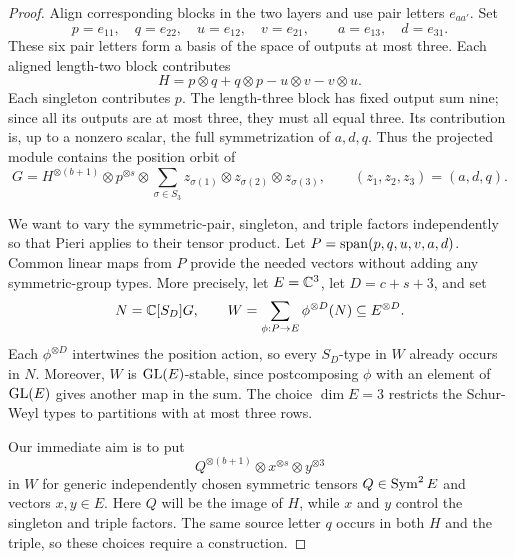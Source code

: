 \begin{proof}
Align corresponding blocks in the two layers and use pair letters
$e_{aa'}$.  Set
\[
 p=e_{11},\quad q=e_{22},\quad u=e_{12},\quad v=e_{21},
 \qquad a=e_{13},\quad d=e_{31}.
\]
These six pair letters form a basis of the space of outputs at
most three.  Each aligned length-two block contributes
\begin{equation}
 H=p\otimes q+q\otimes p-u\otimes v-v\otimes u.
 \label{bal:four-form}
\end{equation}
Each singleton contributes $p$.  The length-three block has
fixed output sum nine; since all its outputs are at most three,
they must all equal three.  Its contribution is, up to a nonzero
scalar, the full symmetrization of $a,d,q$.  Thus the projected
module contains the position orbit of
\begin{equation}
 G=H^{\otimes(b+1)}\otimes p^{\otimes s}
       \otimes\sum_{\sigma\in S_3}
                z_{\sigma(1)}\otimes z_{\sigma(2)}
                              \otimes z_{\sigma(3)},
 \qquad (z_1,z_2,z_3)=(a,d,q).
 \label{bal:three-generator}
\end{equation}

We want to vary the symmetric-pair, singleton, and triple factors
independently so that Pieri applies to their tensor product.
Let $P=\operatorname{span}(p,q,u,v,a,d)$. Common linear maps from $P$ provide
the needed vectors without adding any symmetric-group types.
More precisely, let $E=\mathbb C^3$, let $D=c+s+3$, and set
\[
 N=\mathbb C[S_D]G,\qquad
 W=\sum_{\phi:P\to E}\phi^{\otimes D}(N)
       \subseteq E^{\otimes D}.
\]
Each $\phi^{\otimes D}$ intertwines the position action, so every
$S_D$-type in $W$ already occurs in $N$. Moreover, $W$ is
$\operatorname{GL}(E)$-stable, since postcomposing $\phi$ with an element of
$\operatorname{GL}(E)$ gives another map in the sum. The choice $\dim E=3$
restricts the Schur-Weyl types to partitions with at most three rows.

Our immediate aim is to put
\begin{equation}
 Q^{\otimes(b+1)}\otimes x^{\otimes s}\otimes y^{\otimes3}
 \label{bal:independent-tensors}
\end{equation}
in $W$ for generic independently chosen symmetric tensors
$Q\in\operatorname{Sym}^2 E$ and vectors $x,y\in E$. Here $Q$ will be the
image of $H$, while $x$ and $y$ control the singleton and triple
factors. The same source letter $q$ occurs in both $H$ and the
triple, so these choices require a construction.


\end{proof}
